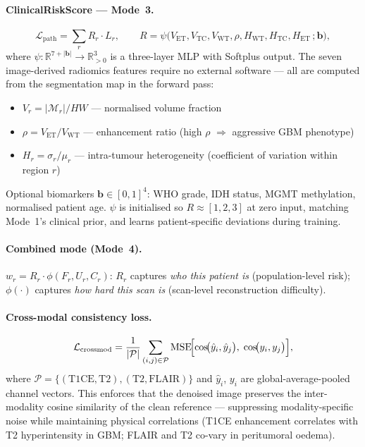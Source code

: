 \documentclass[runningheads]{llncs}
\newcommand{\ET}{\text{ET}}
\newcommand{\TC}{\text{TC}}
\newcommand{\WT}{\text{WT}}
\begin{document}
\paragraph{ClinicalRiskScore — Mode~3.}
\begin{equation}
\mathcal{L}_\text{path} = \textstyle\sum_r R_r \cdot L_r,
\qquad
R = \psi\bigl(V_\ET, V_\TC, V_\WT, \rho, H_\WT, H_\TC, H_\ET\,;
              \mathbf{b}\bigr),
\label{eq:clinrisk}
\end{equation}
where $\psi:\mathbb{R}^{7+|\mathbf{b}|}\!\to\!\mathbb{R}^3_{>0}$
is a three-layer MLP with Softplus output.
The seven image-derived radiomics features require no external
software — all are computed from the segmentation map in the
forward pass:
\begin{itemize}\setlength\itemsep{0pt}
\item $V_r = |\mathcal{M}_r|/HW$ — normalised volume fraction
\item $\rho = V_\ET/V_\WT$ — enhancement ratio
      (high $\rho$ \!$\Rightarrow$\! aggressive GBM phenotype)
\item $H_r = \sigma_r/\mu_r$ — intra-tumour heterogeneity
      (coefficient of variation within region $r$)
\end{itemize}
Optional biomarkers $\mathbf{b}\in[0,1]^4$:
WHO grade, IDH status, MGMT methylation, normalised patient age.
$\psi$ is initialised so $R\approx[1,2,3]$ at zero input,
matching Mode~1's clinical prior, and learns patient-specific
deviations during training.

\paragraph{Combined mode (Mode~4).}
$w_r = R_r \cdot \phi(F_r, U_r, C_r)$:
$R_r$ captures \emph{who this patient is} (population-level risk);
$\phi(\cdot)$ captures \emph{how hard this scan is}
(scan-level reconstruction difficulty).

\paragraph{Cross-modal consistency loss.}
\begin{equation}
\mathcal{L}_\text{crossmod} = \frac{1}{|\mathcal{P}|}
  \sum_{(i,j)\in\mathcal{P}}
  \mathrm{MSE}\!\Bigl[
    \cos\!\bigl(\hat{y}_i, \hat{y}_j\bigr),\;
    \cos\!\bigl(y_i, y_j\bigr)
  \Bigr],
\label{eq:crossmod}
\end{equation}
where $\mathcal{P}{=}\{(\mathrm{T1CE,T2}),(\mathrm{T2,FLAIR})\}$
and $\hat{y}_i$, $y_i$ are global-average-pooled channel vectors.
This enforces that the denoised image preserves the inter-modality
cosine similarity of the clean reference — suppressing
modality-specific noise while maintaining physical correlations
(T1CE enhancement correlates with T2 hyperintensity in GBM;
FLAIR and T2 co-vary in peritumoral oedema).
\end{document}
